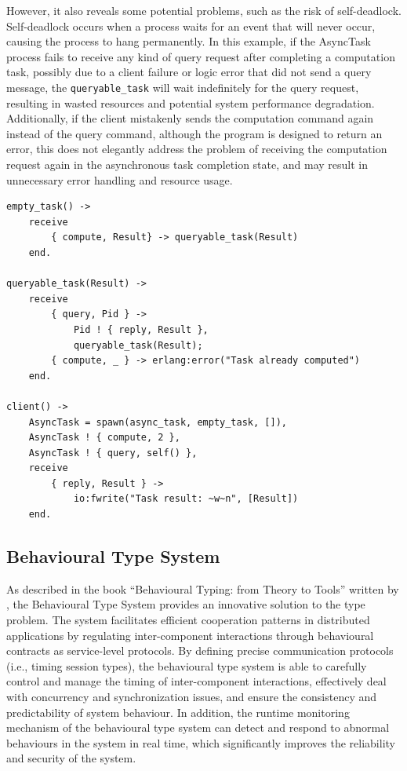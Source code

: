 \documentclass{l4proj}
\begin{document}
However, it also reveals some potential problems, such as the risk of self-deadlock. Self-deadlock occurs when a process waits for an event that will never occur, causing the process to hang permanently. In this example, if the AsyncTask process fails to receive any kind of query request after completing a computation task, possibly due to a client failure or logic error that did not send a query message, the \texttt{queryable\_task} will wait indefinitely for the query request, resulting in wasted resources and potential system performance degradation. Additionally, if the client mistakenly sends the computation command again instead of the query command, although the program is designed to return an error, this does not elegantly address the problem of receiving the computation request again in the asynchronous task completion state, and may result in unnecessary error handling and resource usage.

\lstset{style=erlangstyle}
\begin{lstlisting}[caption={Asynchronous task handling and querying using Erlang adapted from \protect\cite{fowler_2023_special}}, label={lst:erlangExample}]
empty_task() ->
    receive
        { compute, Result} -> queryable_task(Result)
    end.
    
queryable_task(Result) ->
    receive
        { query, Pid } -> 
            Pid ! { reply, Result },
            queryable_task(Result); 
        { compute, _ } -> erlang:error("Task already computed") 
    end.
    
client() ->
    AsyncTask = spawn(async_task, empty_task, []),
    AsyncTask ! { compute, 2 },
    AsyncTask ! { query, self() },
    receive
        { reply, Result } ->
            io:fwrite("Task result: ~w~n", [Result])
    end.
\end{lstlisting}

\subsection{Behavioural Type System}
As described in the book “Behavioural Typing: from Theory to Tools” written by \cite{gay_2017_behavioural}, the Behavioural Type System provides an innovative solution to the type problem. The system facilitates efficient cooperation patterns in distributed applications by regulating inter-component interactions through behavioural contracts as service-level protocols. By defining precise communication protocols (i.e., timing session types), the behavioural type system is able to carefully control and manage the timing of inter-component interactions, effectively deal with concurrency and synchronization issues, and ensure the consistency and predictability of system behaviour. In addition, the runtime monitoring mechanism of the behavioural type system can detect and respond to abnormal behaviours in the system in real time, which significantly improves the reliability and security of the system.
\end{document}
